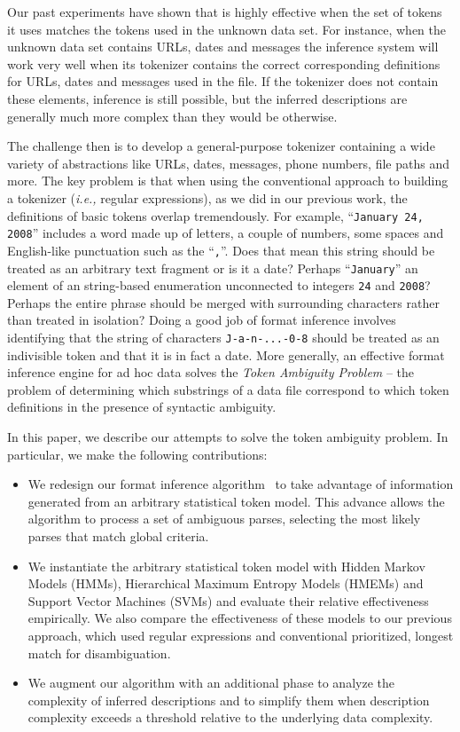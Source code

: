 Our past experiments have shown that \learnpads{} is highly effective
when the set of tokens it uses matches the tokens used in the unknown
data set.  For instance, when the unknown data set contains 
URLs, dates and messages the inference system will work very well when
its tokenizer contains the correct corresponding definitions
for URLs, dates and messages used in the file.  If the
tokenizer does not contain these elements, inference is still possible,
but the inferred descriptions are generally much more complex
than they would be otherwise. 

The challenge then is to develop a general-purpose tokenizer containing
a wide variety of abstractions like URLs, dates, messages,
phone numbers, file paths and more.  The key problem is that
when using the conventional approach 
to building a tokenizer ({\em i.e.,} regular expressions), as we did
in our previous work, the definitions of basic tokens overlap
tremendously.  For example, 
``{\tt January 24, 2008}'' includes a word made up of letters, a couple 
of numbers,
some spaces and English-like punctuation such as the ``{\tt ,}''.  Does that mean 
this string should be treated as an arbitrary text fragment or 
is it a date? Perhaps ``{\tt January}'' an element of an string-based enumeration 
unconnected to integers {\tt 24} and {\tt 2008}?  Perhaps the entire phrase
should be merged with surrounding characters rather than treated
in isolation?  Doing a good job of format
inference involves identifying that the string of characters
{\tt J-a-n-...-0-8} should be treated as an indivisible token and that it is
in fact a date.  More generally, an effective format inference engine
for ad hoc data solves the {\em Token Ambiguity Problem}
-- the problem of determining which substrings of a data file correspond
to which token definitions in the presence of syntactic 
ambiguity.

In this paper, we describe our attempts to solve the token ambiguity problem.
In particular, we make the following contributions:
\begin{itemize}
\item We redesign our format inference algorithm~\cite{fisher+:dirttoshovels} 
to take advantage of information 
generated from an arbitrary statistical token model.
This advance allows the algorithm to process a set of
ambiguous parses, selecting the most likely parses that 
match global criteria.
\item We instantiate the arbitrary statistical token model with
Hidden Markov Models (HMMs), Hierarchical Maximum Entropy Models
(HMEMs) and Support Vector Machines (SVMs) and evaluate 
their relative effectiveness empirically.  We also compare the effectiveness of
these models to our previous approach, which used regular expressions
and conventional prioritized, longest match for disambiguation.
\item We augment our algorithm with an additional phase to
analyze the complexity of inferred descriptions and to simplify
them when description complexity exceeds a threshold relative to
the underlying data complexity.
\end{itemize}

